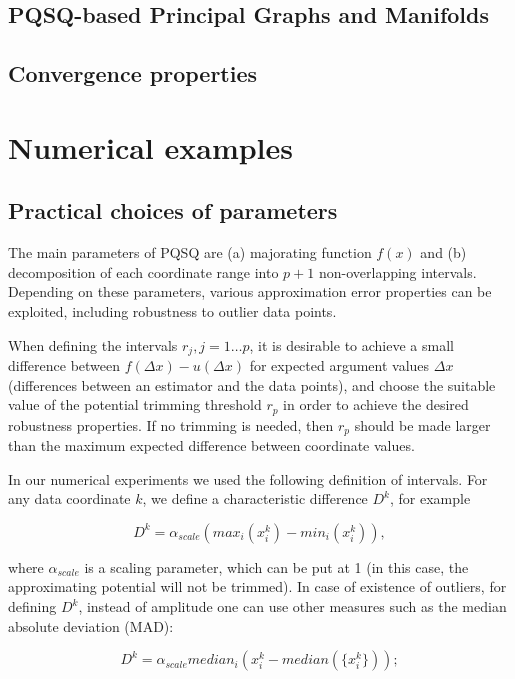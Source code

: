 \documentclass[preprint,12pt]{elsarticle}
\begin{document}
\subsection{PQSQ-based Principal Graphs and Manifolds}


\subsection{Convergence properties}


\section{Numerical examples}

\subsection{Practical choices of parameters}

The main parameters of PQSQ are (a) majorating function $f(x)$ and (b) decomposition of each coordinate range into $p+1$ non-overlapping intervals.
Depending on these parameters, various approximation error properties can be exploited, including robustness to outlier data points.

When defining the intervals $r_j, j=1\dots p$, it is desirable to achieve a small difference between $f(\Delta x)-u(\Delta x)$ for expected argument values $\Delta x$ (differences between an estimator and the data points), and choose the suitable value of the potential trimming threshold $r_p$ in order to achieve the desired robustness properties. If no trimming is needed, then $r_p$ should be made larger than the maximum expected difference between coordinate values.

In our numerical experiments we used the following definition of intervals. For any data coordinate $k$, we define a characteristic difference $D^k$, for example

\begin{equation}\label{characteristic_distance_amplitude}
D^k = \alpha_{scale}(max_i(x_i^k)-min_i(x_i^k)),
\end{equation}

\noindent where $\alpha_{scale}$ is a scaling parameter, which can be put at 1 (in this case, the approximating potential will not be trimmed). In case of existence of outliers, for defining $D^k$, instead of amplitude one can use other measures such as the median absolute deviation (MAD):

\begin{equation}\label{characteristic_distance_mad}
D^k = \alpha_{scale}median_i(x_i^k-median(\{x_i^k\}));
\end{equation}
\end{document}
